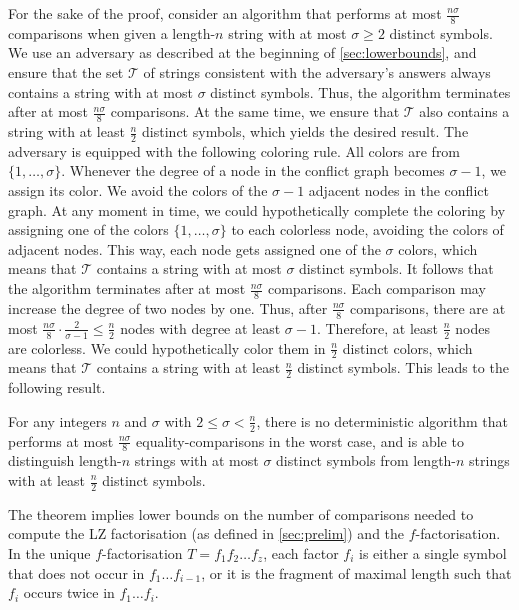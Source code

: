 For the sake of the proof, consider an algorithm that performs at most $\frac{n\sigma} 8$ comparisons when given a length-$n$ string with at most $\sigma \geq 2$ distinct symbols. We use an adversary as described at the beginning of \cref{sec:lowerbounds}, and ensure that the set $\mathcal T$ of strings consistent with the adversary's answers always contains a string with at most $\sigma$ distinct symbols. Thus, the algorithm terminates after at most $\frac{n\sigma} 8$ comparisons. At the same time, we ensure that $\mathcal T$ also contains a string with at least $\frac n 2$ distinct symbols, which yields the desired result. The adversary is equipped with the following coloring rule.
All colors are from $\{1, \dots, \sigma\}$. Whenever the degree of a node in the conflict graph becomes $\sigma - 1$, we assign its color. 
We avoid the colors of the $\sigma - 1$ adjacent nodes in the conflict graph.
At any moment in time, we could hypothetically complete the coloring by assigning one of the colors $\{1, \dots, \sigma\}$ to each colorless node, avoiding the colors of adjacent nodes.
This way, each node gets assigned one of the $\sigma$ colors, which means that $\mathcal T$ contains a string with at most $\sigma$ distinct symbols.
It follows that the algorithm terminates after at most $\frac{n\sigma} 8$ comparisons.
Each comparison may increase the degree of two nodes by one. Thus, after $\frac{n\sigma} 8$ comparisons, there are at most $\frac{n\sigma} 8 \cdot \frac 2{\sigma - 1} \leq \frac{n}{2}$ nodes with degree at least $\sigma - 1$. Therefore, at least $\frac{n}{2}$ nodes are colorless. We could hypothetically color them in $\frac{n}{2}$ distinct colors, which means that $\mathcal T$ contains a string with at least $\frac{n}{2}$ distinct symbols. This leads to the following result.

\begin{theorem}
\label{thm:inapproxalph}
For any integers $n$ and $\sigma$ with $2 \leq \sigma < \frac{n}2$, there is no deterministic algorithm that performs at most $\frac{n \sigma}8$ equality-comparisons in the worst case, and is able to distinguish length-$n$ strings with at most $\sigma$ distinct symbols from length-$n$ strings with at least $\frac{n}2$ distinct symbols. 
\end{theorem}

The theorem implies lower bounds on the number of comparisons needed to compute the LZ factorisation (as defined in \cref{sec:prelim}) and the $f$-factorisation.
In the unique $f$-factorisation $T = f_1f_2\dots f_z$, each factor $f_i$ is either a single symbol that does not occur in $f_1\dots f_{i - 1}$, or it is the fragment of maximal length such that $f_{i}$ occurs twice in $f_1\dots f_{i}$. 

